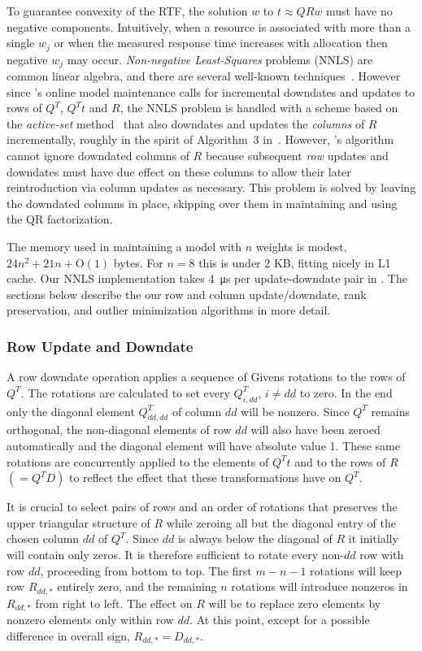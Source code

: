 To guarantee convexity of the RTF, the solution $w$ to $t \approx QRw$ must have no negative components.
Intuitively, when a resource is associated with more than a single $w_j$
or when the measured response time increases with allocation then negative $w_j$ may occur. \emph{Non-negative Least-Squares} problems (NNLS) are common linear algebra, and there are several well-known techniques~\cite{ChPl}.
However since \pacora's online model maintenance calls for
incremental downdates and updates to rows of $Q^T$, $Q^Tt$ and $R$,
the NNLS problem is handled with a scheme
based on the \emph{active-set} method~\cite{LaHa} that
also downdates and updates the \emph{columns} of $R$ incrementally,
roughly in the spirit of Algorithm~3 in~\cite{LuDu}.
However, \pacora's algorithm cannot ignore downdated columns of $R$
because subsequent \emph{row} updates and downdates must have due effect
on these columns to allow their later reintroduction via column updates as necessary.
This problem is solved by leaving the downdated columns in place,
skipping over them in maintaining and using the QR factorization.

The memory used in maintaining a model with $n$ weights is modest, $24n^2 + 21n + \textrm{O}(1)$ bytes.
For $n = 8$ this is under 2 KB, fitting nicely in L1 cache.
Our NNLS implementation takes \SI{4}{\micro\second} per update-downdate pair in \tess.  The sections below describe the our row and column update/downdate, rank preservation, and outlier minimization algorithms in more detail.


\subsubsection{Row Update and Downdate}

A row downdate operation applies
a sequence of Givens rotations to the rows of $Q^T$.
The rotations are calculated to set every $Q^T_{i,dd}$, $i \neq dd$ to zero.
In the end only the diagonal element $Q^T_{dd,dd}$ of column $dd$ will be nonzero.
Since $Q^T$ remains orthogonal, the non-diagonal elements of row $dd$ will also have been zeroed automatically
and the diagonal element will have absolute value 1.
These same rotations are concurrently applied to the elements of $Q^T t$ and to the rows of $R$ $(= Q^T D)$
to reflect the effect that these transformations have on $Q^T$.

It is crucial to select pairs of rows and an order of rotations that preserves the upper triangular structure of $R$
while zeroing all but the diagonal entry of the chosen column $dd$ of $Q^T$.
Since $dd$ is always below the diagonal of $R$ it initially will contain only zeros.
It is therefore sufficient to rotate every non-$dd$ row with row $dd$, proceeding from bottom to top.
The first $m - n - 1$ rotations will keep row $R_{dd,*}$ entirely zero,
and the remaining $n$ rotations will introduce nonzeros in $R_{dd,*}$ from right to left.
The effect on $R$ will be to replace zero elements by nonzero elements only within row $dd$.
At this point, except for a possible difference in overall sign, $R_{dd,*} = D_{dd,*}$.

